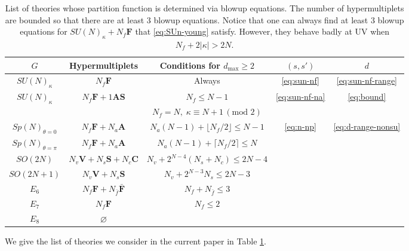 \documentclass[letterpaper, 11pt]{article}
\begin{document}
{\begin{table}[t!]
  \centering
  \begin{tabular}{|c|c|c|c|c|}
    \hline
    $G$ & Hypermultiplets & Conditions for $d_{\text{max}}\ge 2$ &   $(s, s')$ & $d$ \\
    \hline \hline
    $SU(N)_\kappa$ & $N_f \mathbf{F}$ & Always  &    \eqref{eq:sun-nf} & \eqref{eq:sun-nf-range} \\
    \cline{1-5}
    \multirow{2}{*}{$SU(N)_\kappa$} & \multirow{2}{*}{$N_f \mathbf{F}+1\textbf{AS}$} & $N_f \le N-1$ &    \multirow{2}{*}{\eqref{eq:sun-nf-na}} & \multirow{2}{*}{\eqref{eq:bound}} \\\cline{3-3}
	& & $N_f=N,\; \kappa\equiv N+1\,(\text{mod } 2)$ & & \\
    \cline{1-5}
    $Sp(N)_{\theta=0}$ & $N_f\mathbf{F}+N_a \mathbf{A}$ & $N_a(N-1)+\lfloor N_f/2\rfloor\leq  N-1$ &   \multirow{7}{*}{\eqref{eq:n-np}}& \multirow{7}{*}{\eqref{eq:d-range-nonsu}} \\
    \cline{1-3}
    $Sp(N)_{\theta=\pi}$ & $N_f\mathbf{F}+N_a\mathbf{A}$ & $N_a(N-1)+\lceil N_f/2\rceil\le  N$ & & \\
    \cline{1-3}
    $SO(2N)$ & $N_v\mathbf{V}+N_s\mathbf{S}+N_c\mathbf{C}$ & $N_v+2^{N-4}(N_s+N_c) \le  2N-4$ &  & \\
    \cline{1-3}
    $SO(2N+1)$ & $N_v\mathbf{V}+N_s\mathbf{S}$ & $N_v+2^{N-3}N_s \le 2 N-3$ & &   \\
    \cline{1-3}
    $E_6$ & $N_f\mathbf{F}+N_{\bar{f}}\mathbf{\bar{F}}$ & $N_f+N_{\bar{f}} \le 3 $ & &   \\
    \cline{1-3}
    $E_7$ & $N_f\mathbf{F}$ & $N_f \le 2$ & &   \\
    \cline{1-3}
    $E_8$ & $\varnothing$ &  & &   \\
    \hline
    \end{tabular}
    \caption{List of theories whose partition function is determined via blowup equations. The number of hypermultiplets are bounded so that there are at least 3 blowup equations. Notice that one can always find at least 3 blowup equations for $SU(N)_\kappa+N_{f}\mathbf{F}$ that \eqref{eq:SUn-young} satisfy. However, they behave badly at UV when $N_f+2|\kappa|>2N$.  }
    \label{tbl:list}
\end{table}
We give the list of theories we consider in the current paper in Table \ref{tbl:list}. 

}
\end{document}
